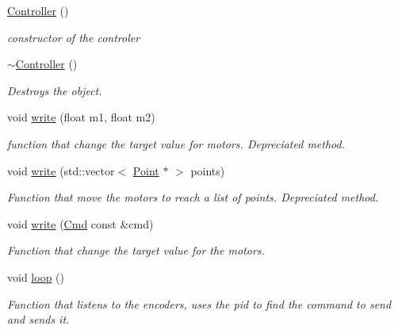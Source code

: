 \begin{DoxyCompactItemize}
\item 
\mbox{\label{class_controller_a95c56822d667e94b031451729ce069a9}} 
\mbox{\hyperlink{class_controller_a95c56822d667e94b031451729ce069a9}{Controller}} ()
\begin{DoxyCompactList}\small\item\em constructor of the controler \end{DoxyCompactList}\item 
\mbox{\label{class_controller_a0ab87934c4f7a266cfdb86e0f36bc1b5}} 
\mbox{\hyperlink{class_controller_a0ab87934c4f7a266cfdb86e0f36bc1b5}{$\sim$\+Controller}} ()
\begin{DoxyCompactList}\small\item\em Destroys the object. \end{DoxyCompactList}\item 
void \mbox{\hyperlink{class_controller_a87fda36917f4b5dd6d72ef2621f68ca2}{write}} (float m1, float m2)
\begin{DoxyCompactList}\small\item\em function that change the target value for motors. Depreciated method. \end{DoxyCompactList}\item 
void \mbox{\hyperlink{class_controller_aacc0037377a9e09ed7558a229785516a}{write}} (std\+::vector$<$ \mbox{\hyperlink{struct_point}{Point}} $\ast$ $>$ points)
\begin{DoxyCompactList}\small\item\em Function that move the motors to reach a list of points. Depreciated method. \end{DoxyCompactList}\item 
void \mbox{\hyperlink{class_controller_a68ebf75325d5f6731279f52bef348757}{write}} (\mbox{\hyperlink{struct_cmd}{Cmd}} const \&cmd)
\begin{DoxyCompactList}\small\item\em Function that change the target value for the motors. \end{DoxyCompactList}\item 
\mbox{\label{class_controller_a9ec8c2d4a68acccd118537c36894e516}} 
void \mbox{\hyperlink{class_controller_a9ec8c2d4a68acccd118537c36894e516}{loop}} ()
\begin{DoxyCompactList}\small\item\em Function that listens to the encoders, uses the pid to find the command to send and sends it. \end{DoxyCompactList}\item 

\end{DoxyCompactItemize}
